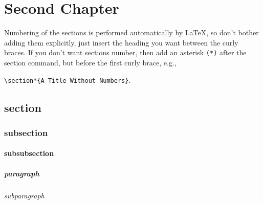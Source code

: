 \chapter{Second Chapter}%

Numbering of the sections is performed automatically by LaTeX, so don't bother adding them explicitly, just insert the heading you want between the curly braces.
If you don't want sections number, then add an asterisk \texttt{(*)} after the section command, but before the first curly brace, e.g.,

\verb|\section*{A Title Without Numbers}|.

\section{section}%

\subsection{subsection}%

\subsubsection{subsubsection}%

\paragraph{paragraph}%

\subparagraph{subparagraph}%